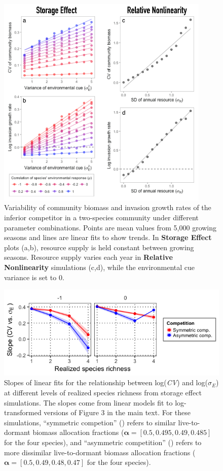 \documentclass[11pt,]{article}
\begin{document}
\begin{figure}[!ht]
  \centering
      \includegraphics[width=4in]{./components/SI_invasion_factorials.png}
  \caption{Variability of community biomass and invasion growth rates of the inferior competitor in a two-species community under different parameter combinations. Points are mean values from 5,000 growing seasons and lines are linear fits to show trends. In \textbf{Storage Effect} plots (a,b), resource supply is held constant between growing seasons. Resource supply varies each year in \textbf{Relative Nonlinearity} simulations (c,d), while the environmental cue variance is set to 0.}
\end{figure}

\newpage{}

\begin{figure}[!ht]
  \centering
      \includegraphics[width=5in]{./components/storage_effect_div+envar_varycomp_loglog_slopes.png}
  \caption{Slopes of linear fits for the relationship between log(\emph{CV}) and log($\sigma_E$) at different levels of realized species richness from storage effect simulations. The slopes come from linear models fit to log-transformed versions of Figure 3 in the main text. For these simulations, ``symmetric competion'' (\tikzcircle{1.5pt}) refers to similar live-to-dormant biomass allocation fractions ($\boldsymbol{\alpha} = [0.5, 0.495, 0.49, 0.485]$ for the four species), and ``asymmetric competition'' (\tikzcircle[fill=blue]{1.5pt}) refers to more dissimilar live-to-dormant biomass allocation fractions ($\boldsymbol{\alpha} = [0.5, 0.49, 0.48, 0.47]$ for the four species).}
\end{figure}
\end{document}
